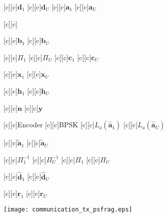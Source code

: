 \documentclass{article}
\begin{document}
\begin{figure}[htb]
  \begin{center}


        [c][c]{$\mathrm{\mathbf{d}}_1$}
        [c][c]{$\mathrm{\mathbf{d}}_U$}
        [c][c]{$\mathrm{\mathbf{a}}_1$}
        [c][c]{$\mathrm{\mathbf{a}}_U$}
	
	[c]{$\mathrm{}$}
	
        [c][c]{$\mathrm{\mathbf{b}}_1$}
        [c][c]{$\mathrm{\mathbf{b}}_U$}
	
        [c][c]{$\Pi_1$}
        [c][c]{$\Pi_U$}
        [c][c]{$\mathrm{\mathbf{c}}_1$}
        [c][c]{$\mathrm{\mathbf{c}}_U$}

        [c][c]{$\mathrm{\mathbf{x}}_1$}
        [c][c]{$\mathrm{\mathbf{x}}_U$}
	
	[c]{$\mathrm{\mathbf{h}}_1$}
        [c][c]{$\mathrm{\mathbf{h}}_U$}


        [c][c]{$\mathrm{\mathbf{n}}$}
        [c][c]{$\mathrm{\mathbf{y}}$}

        [c][c]{Encoder}
        [c][c]{BPSK}
	[c]{$L_a(\mathrm{\mathbf{\hat{a}}}_1)$}
        [c][c]{$L_a(\mathrm{\mathbf{\hat{a}}}_U)$}

	
	
	
        
        
	[c]{\hspace{3mm}$\mathrm{\mathbf{\tilde{a}}}_1$}
        [c][c]{\hspace{3mm}$\mathrm{\mathbf{\tilde{a}}}_U$}
        
	[c]{\hspace{1mm}$\Pi_1^{-1}$}
        [c][c]{\hspace{1mm}$\Pi_U^{-1}$}
        [c][c]{$\Pi_1$}
        [c][c]{$\Pi_U$}
       
	[c]{$\mathrm{\mathbf{\hat{d}}}_1$}
        [c][c]{\hspace{-4mm}$\mathrm{\mathbf{\hat{d}}}_U$}
	

        [c][c]{$\mathrm{\mathbf{r}}_1$}
	[c]{$\mathrm{\mathbf{r}}_U$}
	

	
	
	


    \texttt{[image: communication\_tx\_psfrag.eps]}
    \end{center}
\end{figure}
\end{document}

